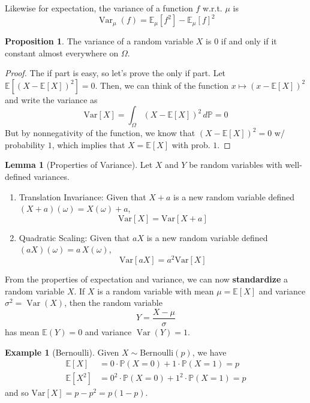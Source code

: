 \documentclass{article}
\DeclareMathOperator{\Var}{Var}
\theoremstyle{definition}
\newtheorem{proposition}[theorem]{Proposition}
\newtheorem{lemma}[theorem]{Lemma}
\newtheorem{example}{Example}[section]
\theoremstyle{remark}
\theoremstyle{definition}
\begin{document}
Likewise for expectation, the variance of a function $f$ w.r.t. $\mu$ is 
\[\Var_\mu (f) = \mathbb{E}_\mu [f^2] - \mathbb{E}_\mu [f]^2\]

\begin{proposition}
The variance of a random variable $X$ is $0$ if and only if it constant almost everywhere on $\Omega$. 
\end{proposition}
\begin{proof}
The if part is easy, so let's prove the only if part. Let $\mathbb{E} [ (X - \mathbb{E}[X])^2 ] = 0$. Then, we can think of the function $x \mapsto (x - \mathbb{E}[X])^2$ and write the variance as 
\[\mathrm{Var}[X] = \int_\Omega (X - \mathbb{E}[X])^2 \, d\mathbb{P} = 0\]
But by nonnegativity of the function, we know that $(X - \mathbb{E}[X])^2 = 0$ w/ probability $1$, which implies that $X = \mathbb{E}[X]$ with prob. $1$. 
\end{proof}

\begin{lemma}[Properties of Variance]
Let $X$ and $Y$ be random variables with well-defined variances. 
\begin{enumerate}
    \item Translation Invariance: Given that $X + a$ is a new random variable defined $(X + a)(\omega) = X(\omega) + a$, 
    \[\mathrm{Var}[X] = \mathrm{Var}[X + a]\]
    \item Quadratic Scaling: Given that $aX$ is a new random variable defined $(aX)(\omega) = a\,X(\omega)$, 
    \[\mathrm{Var}[aX] = a^2 \mathrm{Var}[X]\]
\end{enumerate}
\end{lemma}

From the properties of expectation and variance, we can now \textbf{standardize} a random variable $X$. If $X$ is a random variable with mean $\mu = \mathbb{E}[X]$ and variance $\sigma^2 = \Var(X)$, then the random variable 
\[Y = \frac{X - \mu}{\sigma}\]
has mean $\mathbb{E}(Y) = 0$ and variance $\Var(Y) = 1$. 

\begin{example}[Bernoulli]
Given $X \sim \mathrm{Bernoulli}(p)$, we have
\begin{align*}
    \mathbb{E}[X] & = 0 \cdot \mathbb{P}(X = 0) + 1 \cdot \mathbb{P}(X = 1) = p \\
    \mathbb{E}[X^2] & =  0^2 \cdot \mathbb{P}(X = 0) + 1^2 \cdot \mathbb{P}(X = 1) = p
\end{align*}
and so $\mathrm{Var}[X] = p - p^2 = p(1 - p)$. 
\end{example}
\end{document}
